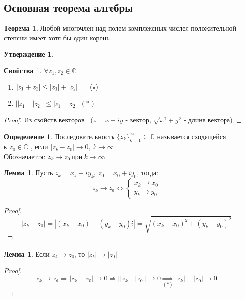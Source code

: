 \documentclass[a4paper, 12pt]{article}
\newcommand\tab[1][.5cm]{\hspace*{#1}}
\newcounter{lemcount}
\newcounter{lemcount2}
\theoremstyle{definition}
\newtheorem*{definition}{Определение}
\newtheorem*{theorem}{Теорема}
\newtheorem*{subtheorem}{Утверждение}
\newtheorem*{properties}{Свойства}
\newtheorem{lemmanum}[lemcount]{Лемма}
\begin{document}
  \subsection{Основная теорема алгебры}
  \begin{theorem}
    Любой многочлен над полем комплексных числел положительной степени имеет хотя бы один корень.
  \end{theorem}
  \begin{subtheorem}\tab
    \begin{properties}\tab
      $\forall z_1, z_2 \in \mathbb{C}$
      \begin{enumerate} 
        \item $|z_1+z_2|\leq |z_1| + |z_2| \tab[0.61cm] (\star)$
        \item $||z_1|-|z_2||\leq |z_1-z_2| \ \ (*)$ 
      \end{enumerate}
      \begin{proof}
        Из свойств векторов \ ($z = x+iy$ - вектор, $\sqrt{x^2+y^2}$ - длина вектора)
      \end{proof} 
    \end{properties}
  \end{subtheorem}
  \begin{definition}
    Последовательность $\{z_k\}_{k=1}^{\infty} \subseteq \mathbb{C}$ называется сходящейся \\ к $z_0 \in \mathbb{C}$ , если $|z_k-z_0| \to 0, \ k\to \infty$\\
    Обозначается: $z_k \to z_0 \ \text{при} \ k\to \infty$ 
  \end{definition} 
  \setcounter{lemcount}{0}
  \begin{lemmanum}
    Пусть $z_k = x_k+iy_k, \ z_0 = x_0 + iy_0$, тогда:
    $$z_k \to z_0 \Longleftrightarrow \begin{cases}
      x_k \to x_0 \\
      y_k \to y_0
    \end{cases}$$  
  \end{lemmanum} 
  \begin{proof}
    $$|z_k-z_0|  = |(x_k - x_0) + (y_k - y_0)i| = \sqrt{(x_k - x_0)^2+(y_k - y_0)^2}$$ 
  \end{proof} 
  \begin{lemmanum}
    Если $z_k \to z_0$, то $|z_k| \to |z_0|$  
  \end{lemmanum} 
  \begin{proof}
    $$z_k \to z_0 \Longrightarrow |z_k - z_0| \to 0 \Longrightarrow ||z_k|-|z_0|| \to 0 \underset{(*)}{\Longrightarrow} |z_k| - |z_0| \to 0$$ 
  \end{proof} 
\end{document}
